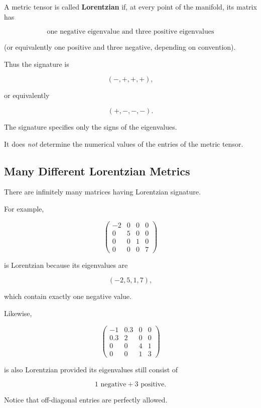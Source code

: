 \documentclass[12pt,a4paper]{article}
\theoremstyle{notespace}
\begin{document}
A metric tensor is called \textbf{Lorentzian} if, at every point of the manifold, its matrix has

\[
\boxed{\text{one negative eigenvalue and three positive eigenvalues}}
\]

(or equivalently one positive and three negative, depending on convention).

Thus the signature is

\[
(-,+,+,+),
\]

or equivalently

\[
(+,-,-,-).
\]

The signature specifies only the signs of the eigenvalues.

It does \emph{not} determine the numerical values of the entries of the metric tensor.


\subsection{Many Different Lorentzian Metrics}

There are infinitely many matrices having Lorentzian signature.

For example,

\[
\begin{pmatrix}
	-2&0&0&0\\
	0&5&0&0\\
	0&0&1&0\\
	0&0&0&7
\end{pmatrix}
\]

is Lorentzian because its eigenvalues are

\[
(-2,5,1,7),
\]

which contain exactly one negative value.

Likewise,

\[
\begin{pmatrix}
	-1&0.3&0&0\\
	0.3&2&0&0\\
	0&0&4&1\\
	0&0&1&3
\end{pmatrix}
\]

is also Lorentzian provided its eigenvalues still consist of

\[
1\text{ negative}+3\text{ positive}.
\]

Notice that off-diagonal entries are perfectly allowed.

\end{document}
